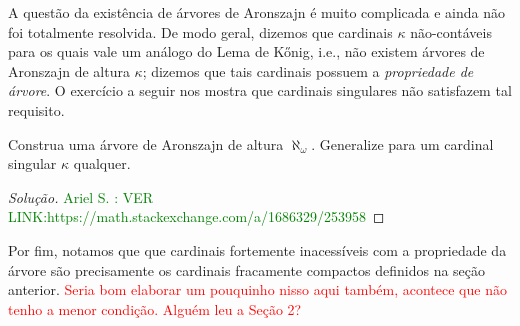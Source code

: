 \documentclass[a4paper]{article}
\begin{document}
 A questão da existência de árvores de Aronszajn é muito complicada e ainda não
 foi totalmente resolvida. De modo geral, dizemos que cardinais \(\kappa\)
 não-contáveis para os quais vale um  análogo do Lema de Kőnig, i.e., não
 existem árvores  de Aronszajn de altura $\kappa$; dizemos que tais cardinais
 possuem a  \textit{propriedade de árvore}. O exercício a seguir nos mostra que
 cardinais singulares não satisfazem tal requisito.

 \begin{exercicio}
  Construa uma árvore de Aronszajn de altura \(\aleph_{\omega}\). Generalize
  para um cardinal singular \(\kappa\) qualquer.
\end{exercicio}
\begin{proof}[Solução]
\textcolor{green}{Ariel S. : VER LINK:https://math.stackexchange.com/a/1686329/253958}
\end{proof}

 Por fim, notamos que que cardinais
 fortemente inacessíveis com a propriedade da árvore são precisamente os
 cardinais fracamente compactos definidos na seção anterior.
 \textcolor{red}{Seria bom elaborar um pouquinho nisso aqui também, acontece
   que não tenho a menor condição. Alguém leu a Seção 2?}

  
  
\end{document}
